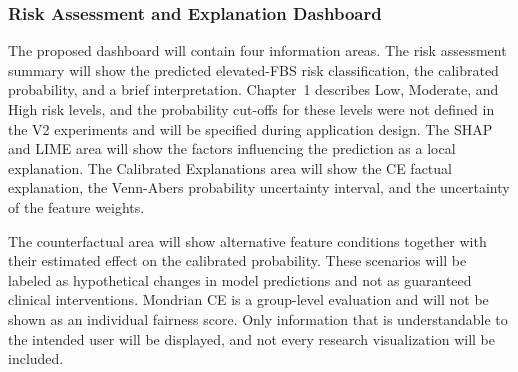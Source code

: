 \documentclass[11pt,a4paper,titlepage]{article}
\begin{document}

\subsubsection{Risk Assessment and Explanation Dashboard}

The proposed dashboard will contain four information areas. The risk assessment summary will show the predicted elevated-FBS risk classification, the calibrated probability, and a brief interpretation. Chapter~1 describes Low, Moderate, and High risk levels, and the probability cut-offs for these levels were not defined in the V2 experiments and will be specified during application design. The SHAP and LIME area will show the factors influencing the prediction as a local explanation. The Calibrated Explanations area will show the CE factual explanation, the Venn-Abers probability uncertainty interval, and the uncertainty of the feature weights.

The counterfactual area will show alternative feature conditions together with their estimated effect on the calibrated probability. These scenarios will be labeled as hypothetical changes in model predictions and not as guaranteed clinical interventions. Mondrian CE is a group-level evaluation and will not be shown as an individual fairness score. Only information that is understandable to the intended user will be displayed, and not every research visualization will be included.




\end{document}
